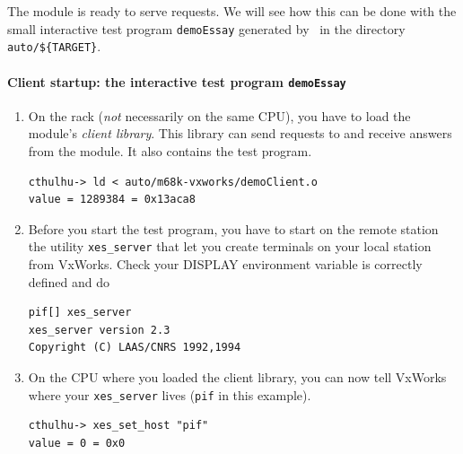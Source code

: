 The module is ready to serve  requests. We will see  how this can be done
with the small  interactive   test program {\tt demoEssay}   generated by
\GenoM\ in the directory {\tt auto/\$\{TARGET\}}.

\paragraph{Client startup: the interactive test program {\tt demoEssay}}

\begin{enumerate}

\item On the rack ({\em not} necessarily on the same CPU), you have to
load the module's {\em client library}. This library can send requests
to and receive answers from the module. It also contains the test
program.

\begin{center}\begin{cartouche}\small\begin{verbatim}
cthulhu-> ld < auto/m68k-vxworks/demoClient.o
value = 1289384 = 0x13aca8
\end{verbatim}\end{cartouche}\end{center}

\item Before you start the test program, you have to start on the remote
station  the utility {\tt xes\_server}   that let you  create terminals on
your local station from VxWorks. Check your DISPLAY environment variable
is correctly defined and do

\begin{center}\begin{cartouche}\small\begin{verbatim}
pif[] xes_server
xes_server version 2.3
Copyright (C) LAAS/CNRS 1992,1994
\end{verbatim}\end{cartouche}\end{center}

\item On the CPU where you loaded the client library, you can now
tell VxWorks  where your   {\tt xes\_server} lives   ({\tt pif}  in  this
example).

\begin{center}\begin{cartouche}\small\begin{verbatim}
cthulhu-> xes_set_host "pif"
value = 0 = 0x0
\end{verbatim}\end{cartouche}\end{center}


\end{enumerate}
